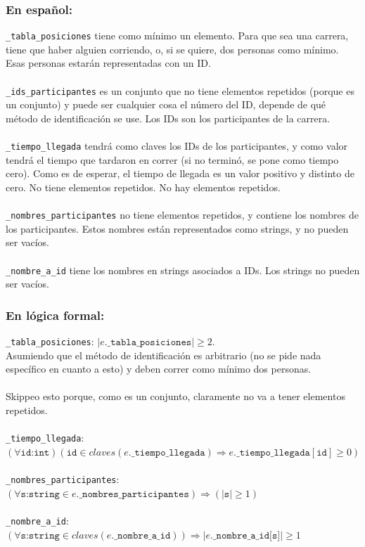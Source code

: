 \documentclass{article}
\begin{document}
            \subsubsection*{En español:}
                \texttt{\_tabla\_posiciones} tiene como mínimo un elemento. Para que sea una carrera, tiene que haber alguien corriendo, o, si se quiere, dos personas como mínimo. Esas personas estarán representadas con un ID. \\
                \\
                \texttt{\_ids\_participantes} es un conjunto que no tiene elementos repetidos (porque es un conjunto) y puede ser cualquier cosa el número del ID, depende de qué método de identiﬁcación se use. Los IDs son los participantes de la carrera. \\
                \\
                \texttt{\_tiempo\_llegada} tendrá como claves los IDs de los participantes, y como valor tendrá el tiempo que tardaron en correr (si no terminó, se pone como tiempo cero). Como es de esperar, el tiempo de llegada es un valor positivo y distinto de cero. No tiene elementos repetidos. No hay elementos repetidos. \\
                \\
                \texttt{\_nombres\_participantes} no tiene elementos repetidos, y contiene los nombres de los participantes. Estos nombres están representados como strings, y no pueden ser vacíos. \\
                \\
                \texttt{\_nombre\_a\_id} tiene los nombres en strings asociados a IDs. Los strings no pueden ser vacíos.
            \subsubsection*{En lógica formal:}
                \texttt{\_tabla\_posiciones}: \( |e.\texttt{\_tabla\_posiciones}| \geq 2 \). \\
                Asumiendo que el método de identiﬁcación es arbitrario (no se pide nada específico en cuanto a esto) y deben correr como mínimo dos personas. \\
                \\
                Skippeo esto porque, como es un conjunto, claramente no va a tener elementos repetidos. \\
                \\
                \texttt{\_tiempo\_llegada}: \( (\forall \texttt{id:int}) (\texttt{id} \in claves(e.\texttt{\_tiempo\_llegada}) \Rightarrow e.\texttt{\_tiempo\_llegada}[\texttt{id}] \geq 0) \) \\
                \\
                \texttt{\_nombres\_participantes}: \( (\forall \texttt{s:string} \in e.\texttt{\_nombres\_participantes}) \Rightarrow (|\texttt{s}| \geq 1) \) \\
                \\
                \texttt{\_nombre\_a\_id}: \( (\forall \texttt{s:string} \in claves(e.\texttt{\_nombre\_a\_id})) \Rightarrow |e.\texttt{\_nombre\_a\_id[s]}| \geq 1 \)
\end{document}
